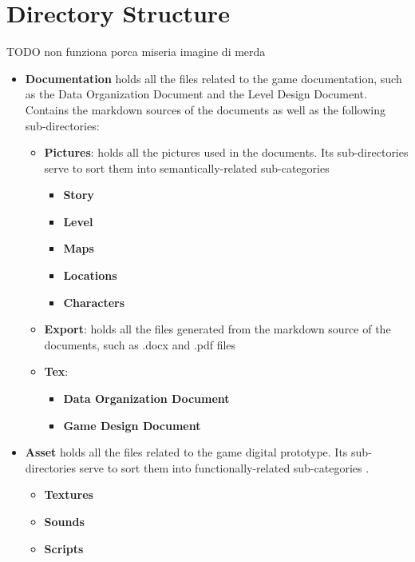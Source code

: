 \section{Directory Structure}
 
TODO non funziona porca miseria imagine di merda 

	\begin{itemize}
		\item \textbf{Documentation} holds all the files related to the game documentation, such as the Data Organization Document and the Level Design Document. Contains the markdown sources of the documents as well as the following sub-directories:
		\begin{itemize}
			\item \textbf{Pictures}: holds all the pictures used in the documents. Its sub-directories serve to sort them into semantically-related sub-categories 
				\begin{itemize}
					\item \textbf{Story}
					\item \textbf{Level}
					\item \textbf{Maps}
					\item \textbf{Locations}
					\item \textbf{Characters}
					\end{itemize}
		 	\item \textbf{Export}: holds all the files generated from the markdown source of the documents, such as .docx and .pdf files 
 	\item \textbf{Tex}: %
	\begin{itemize}
					\item \textbf{Data Organization Document}
					\item \textbf{Game Design Document}
				\end{itemize}
		\end{itemize}

		\item \textbf{Asset}  holds all the files related to the game digital prototype. Its sub-directories serve to sort them into functionally-related sub-categories . 
				\begin{itemize}
					\item \textbf{Textures}
					\item \textbf{Sounds}
					\item \textbf{Scripts}
				\end{itemize}
					

	\end{itemize}
					
\pagebreak
